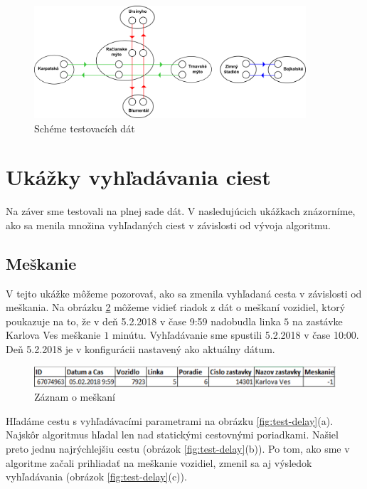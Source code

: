 \begin{figure}[H]
\centerline{\includegraphics[width=0.9\textwidth]{images/test-schema}}
\caption[Schéma testovacích dát]{Schéme testovacích dát}
\label{fig:test-schema}
\end{figure}

\section{Ukážky vyhľadávania ciest}
Na záver sme testovali na plnej sade dát. V nasledujúcich ukážkach znázorníme, ako sa menila množina vyhľadaných ciest v závislosti od vývoja algoritmu.

\subsection{Meškanie}
V tejto ukážke môžeme pozorovať, ako sa zmenila vyhľadaná cesta v závislosti od meškania. Na obrázku \ref{fig:delay-row} môžeme vidieť riadok z dát o meškaní vozidiel, ktorý poukazuje na to, že v deň 5.2.2018 v čase 9:59 nadobudla linka $5$ na zastávke Karlova Ves meškanie $1$ minútu. Vyhľadávanie sme spustili 5.2.2018 v čase 10:00. Deň 5.2.2018 je v konfigurácii nastavený ako aktuálny dátum. 

\begin{figure}[H]
\centerline{\includegraphics[width=1.0\textwidth]{images/delay-row}}
\caption[Záznam o meškaní]{Záznam o meškaní}
\label{fig:delay-row}
\end{figure}

Hľadáme cestu s vyhľadávacími parametrami na obrázku \ref{fig:test-delay}(a). Najskôr algoritmus hľadal len nad statickými cestovnými poriadkami. Našiel preto jednu najrýchlejšiu cestu (obrázok \ref{fig:test-delay}(b)). 
Po tom, ako sme v algoritme začali prihliadať na meškanie vozidiel, zmenil sa aj výsledok vyhľadávania (obrázok \ref{fig:test-delay}(c)). 

